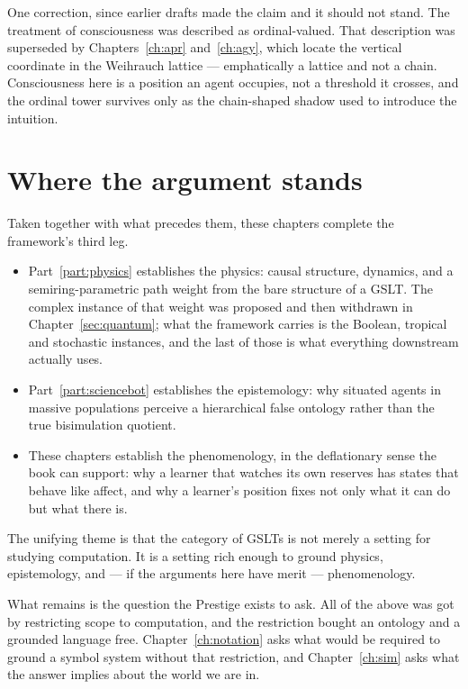 One correction, since earlier drafts made the claim and it should not
stand.
The treatment of consciousness was described as ordinal-valued.
That description was superseded by Chapters~\ref{ch:apr}
and~\ref{ch:agy}, which locate the vertical coordinate in the Weihrauch
lattice --- emphatically a lattice and not a chain.
Consciousness here is a position an agent occupies, not a threshold it
crosses, and the ordinal tower survives only as the chain-shaped shadow
used to introduce the intuition.

\section{Where the argument stands}

Taken together with what precedes them, these chapters complete the
framework's third leg.

\begin{itemize}[itemsep=4pt]
  \item Part~\ref{part:physics} establishes the physics: causal
        structure, dynamics, and a semiring-parametric path weight from
        the bare structure of a GSLT.
        The complex instance of that weight was proposed and then
        withdrawn in Chapter~\ref{sec:quantum}; what the framework
        carries is the Boolean, tropical and stochastic instances, and
        the last of those is what everything downstream actually uses.

  \item Part~\ref{part:sciencebot} establishes the epistemology: why
        situated agents in massive populations perceive a hierarchical
        false ontology rather than the true bisimulation quotient.

  \item These chapters establish the phenomenology, in the deflationary
        sense the book can support: why a learner that watches its own
        reserves has states that behave like affect, and why a learner's
        position fixes not only what it can do but what there is.
\end{itemize}

The unifying theme is that the category of GSLTs is not merely a setting
for studying computation.
It is a setting rich enough to ground physics, epistemology, and --- if
the arguments here have merit --- phenomenology.

What remains is the question the Prestige exists to ask.
All of the above was got by restricting scope to computation, and the
restriction bought an ontology and a grounded language free.
Chapter~\ref{ch:notation} asks what would be required to ground a symbol
system without that restriction, and Chapter~\ref{ch:sim} asks what the
answer implies about the world we are in.

